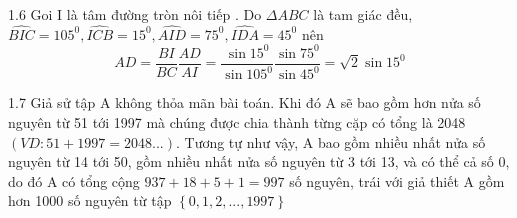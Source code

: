 \begin{Answer}{1.6}
Goi I là tâm đường tròn nôi tiếp . Do $\Delta ABC$ là tam giác đều, $\widehat{BIC} = 105^0 ,\widehat{ICB} = 15^0,\widehat{AID} = 75^0,\widehat{IDA} = 45^0$ nên$$ AD = \frac{{BI}}{{BC}}\frac{{AD}}{{AI}} = \frac{{\sin 15^0 }}{{\sin 105^0 }}\frac{{\sin 75^0 }}{{\sin 45^0 }} = \sqrt 2 \sin 15^0  $$
\end{Answer}
\begin{Answer}{1.7}
\noindent
Giả  sử tập A không thỏa mãn bài toán. Khi đó A sẽ bao gồm hơn nửa số nguyên từ 51 tới 1997 mà chúng được chia thành từng cặp có tổng là 2048 $\left( {VD:51 + 1997 = 2048...} \right)$. Tương tự như vậy, A bao gồm nhiều nhất nửa số nguyên từ 14  tới 50, gồm nhiều nhất nửa số nguyên từ 3 tới 13, và có thể cả số 0, do đó A có tổng cộng  $937+18+5+1=997$ số nguyên, trái với giả thiết A gồm hơn 1000 số nguyên từ tập $\left\{ {0,1,2,...,1997} \right\}$
\end{Answer}
